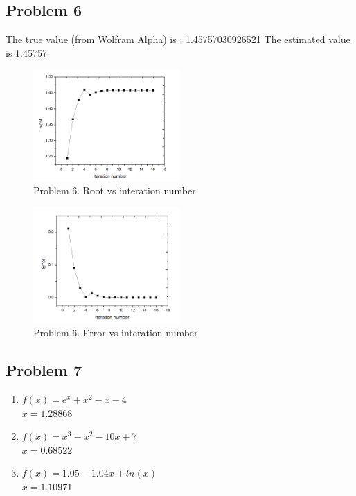 \documentclass{article}
\begin{document}
\hypertarget{problem_6_homework_checklist_2}{}
\subsection*{{Problem 6}}
\label{}
The true value (from Wolfram Alpha)  is : 1.45757030926521
The estimated value is 1.45757
 \begin{figure}
 \centering 
 \includegraphics[width=0.5\textwidth]{root_6}
 \caption{Problem 6. Root vs interation number} 
 \end{figure} 
  \begin{figure}
 \centering 
 \includegraphics[width=0.5\textwidth]{error_6}
  \caption{Problem 6. Error vs interation number} 
 \end{figure} 

\hypertarget{problem_6_homework_checklist_2}{}
\subsection*{{Problem 7}}
\label{}
\begin{enumerate}
\item 
$f(x)=e^x+x^2-x-4 $  \\
$x=1.28868 $ \\
\item 
$f(x) =x^3-x^2-10x+7 $ \\
$x=0.68522 $\\
\item 
$f(x) = 1.05-1.04x+ln(x) $\\
$x= 1.10971$ \\

\end{enumerate}
\end{document}
